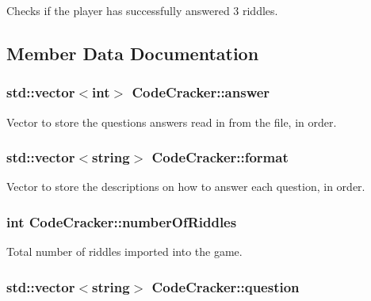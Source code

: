 Checks if the player has successfully answered 3 riddles. 



\subsection{Member Data Documentation}
\hypertarget{classCodeCracker_a2084c27e05ec80c44263cb2f9a54d8c4}{
\subsubsection[{answer}]{\setlength{\rightskip}{0pt plus 5cm}std\-::vector$<$int$>$ Code\-Cracker\-::answer\hspace{0.3cm}{\ttfamily [private]}}}\label{classCodeCracker_a2084c27e05ec80c44263cb2f9a54d8c4}


Vector to store the questions answers read in from the file, in order. 

\hypertarget{classCodeCracker_a6ab76d405fa6a989fdd10c7641f6bc4e}{
\subsubsection[{format}]{\setlength{\rightskip}{0pt plus 5cm}std\-::vector$<$string$>$ Code\-Cracker\-::format\hspace{0.3cm}{\ttfamily [private]}}}\label{classCodeCracker_a6ab76d405fa6a989fdd10c7641f6bc4e}


Vector to store the descriptions on how to answer each question, in order. 

\hypertarget{classCodeCracker_a30671a1b282dc98361938283fbafcf6e}{
\subsubsection[{number\-Of\-Riddles}]{\setlength{\rightskip}{0pt plus 5cm}int Code\-Cracker\-::number\-Of\-Riddles\hspace{0.3cm}{\ttfamily [private]}}}\label{classCodeCracker_a30671a1b282dc98361938283fbafcf6e}


Total number of riddles imported into the game. 

\hypertarget{classCodeCracker_ae578bd328ef64ed314b19e5940247f2c}{
\subsubsection[{question}]{\setlength{\rightskip}{0pt plus 5cm}std\-::vector$<$string$>$ Code\-Cracker\-::question\hspace{0.3cm}{\ttfamily [private]}}}\label{classCodeCracker_ae578bd328ef64ed314b19e5940247f2c}


